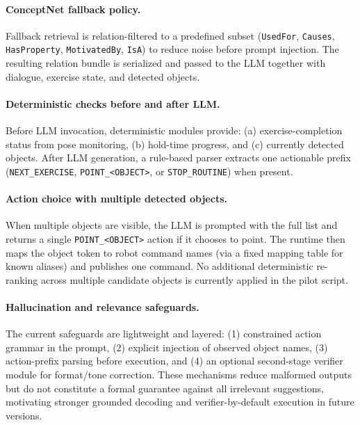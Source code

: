 \documentclass[pdflatex,sn-basic,Numbered,iicol,twocolumn]{sn-jnl}%
\begin{document}
\paragraph{ConceptNet fallback policy.}
Fallback retrieval is relation-filtered to a predefined subset (\texttt{UsedFor}, \texttt{Causes}, \texttt{HasProperty}, \texttt{MotivatedBy}, \texttt{IsA}) to reduce noise before prompt injection. The resulting relation bundle is serialized and passed to the LLM together with dialogue, exercise state, and detected objects.

\paragraph{Deterministic checks before and after LLM.}
Before LLM invocation, deterministic modules provide: (a) exercise-completion status from pose monitoring, (b) hold-time progress, and (c) currently detected objects. After LLM generation, a rule-based parser extracts one actionable prefix (\texttt{NEXT\_EXERCISE}, \texttt{POINT\_<OBJECT>}, or \texttt{STOP\_ROUTINE}) when present.

\paragraph{Action choice with multiple detected objects.}
When multiple objects are visible, the LLM is prompted with the full list and returns a single \texttt{POINT\_<OBJECT>} action if it chooses to point. The runtime then maps the object token to robot command names (via a fixed mapping table for known aliases) and publishes one command. No additional deterministic re-ranking across multiple candidate objects is currently applied in the pilot script.

\paragraph{Hallucination and relevance safeguards.}
The current safeguards are lightweight and layered: (1) constrained action grammar in the prompt, (2) explicit injection of observed object names, (3) action-prefix parsing before execution, and (4) an optional second-stage verifier module for format/tone correction. These mechanisms reduce malformed outputs but do not constitute a formal guarantee against all irrelevant suggestions, motivating stronger grounded decoding and verifier-by-default execution in future versions.
\end{document}
